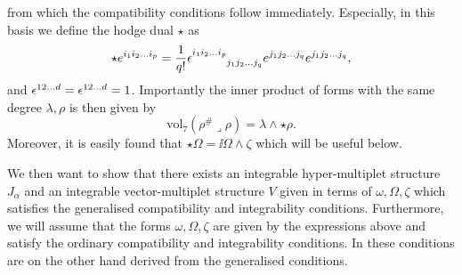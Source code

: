 from which the compatibility conditions follow immediately. Especially, in this basis we define the hodge dual $\star$ as 
\begin{equation}
    \star e^{i_1i_2\ldots i_p} = \frac{1}{q!}\tensor{\epsilon}{^{i_1i_2\ldots i_p}_{j_1j_2\ldots j_q}}e^{j_1j_2\ldots j_q}e^{j_1j_2\ldots j_q},
\end{equation}
and $\tensor{\epsilon}{^{12\ldots d}}=\tensor{\epsilon}{^{12\ldots d}}=1$. Importantly the inner product of forms with the same degree $\lambda,\rho$ is then given by
\begin{equation}
    \text{vol}_7(\rho^{\#}\lrcorner \rho) = \lambda\wedge\star\rho.
\end{equation}
Moreover, it is easily found that $\star\Omega = \ii\Omega\wedge\zeta$ which will be useful below. 

We then want to show that there exists an integrable hyper-multiplet structure $J_\alpha$ and an integrable vector-multiplet structure $V$ given in terms of ${\omega,\Omega,\zeta}$ which satisfies the generalised compatibility and integrability conditions. Furthermore, we will assume that the forms $\omega,\Omega,\zeta$ are given by the expressions above and satisfy the ordinary compatibility and integrability conditions. In \cite{Ashmore:2015joa} these conditions are on the other hand derived from the generalised conditions. 

